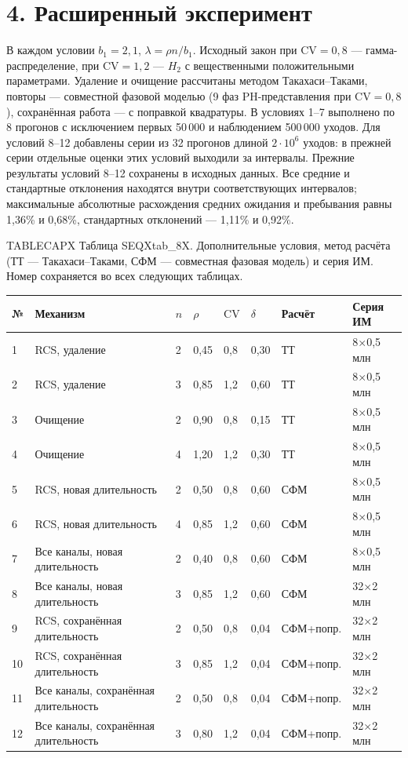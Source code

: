 \section*{4. Расширенный эксперимент}
В каждом условии \(b_1=2{,}1\), \(\lambda=\rho n/b_1\). Исходный закон при \(\mathrm{CV}=0{,}8\) --- гамма-распределение, при \(\mathrm{CV}=1{,}2\) --- \(H_2\) с вещественными положительными параметрами. Удаление и очищение рассчитаны методом Такахаси--Таками, повторы --- совместной фазовой моделью (9 фаз PH-представления при \(\mathrm{CV}=0{,}8\)), сохранённая работа --- с поправкой квадратуры. В условиях 1--7 выполнено по 8 прогонов с исключением первых 50\,000 и наблюдением 500\,000 уходов. Для условий 8--12 добавлены серии из 32 прогонов длиной \(2\cdot10^6\) уходов: в прежней серии отдельные оценки этих условий выходили за интервалы. Прежние результаты условий 8--12 сохранены в исходных данных. Все средние и стандартные отклонения находятся внутри соответствующих интервалов; максимальные абсолютные расхождения средних ожидания и пребывания равны 1,36\% и 0,68\%, стандартных отклонений --- 1,11\% и 0,92\%.

\noindent TABLECAPX Таблица SEQXtab_8X. Дополнительные условия, метод расчёта (ТТ --- Такахаси--Таками, СФМ --- совместная фазовая модель) и серия ИМ. Номер сохраняется во всех следующих таблицах.\par

\setlength{\tabcolsep}{2pt}
\begin{tabular}{p{0.9cm}p{5.2cm}p{0.7cm}p{1.2cm}p{1.0cm}p{1.2cm}p{2.5cm}p{2.2cm}}
\toprule
№ & Механизм & $n$ & $\rho$ & $\mathrm{CV}$ & $\delta$ & Расчёт & Серия ИМ \\
\midrule
1 & RCS, удаление & 2 & 0,45 & 0,8 & 0,30 & ТТ & 8×0,5 млн \\
2 & RCS, удаление & 3 & 0,85 & 1,2 & 0,60 & ТТ & 8×0,5 млн \\
3 & Очищение & 2 & 0,90 & 0,8 & 0,15 & ТТ & 8×0,5 млн \\
4 & Очищение & 4 & 1,20 & 1,2 & 0,30 & ТТ & 8×0,5 млн \\
5 & RCS, новая длительность & 2 & 0,50 & 0,8 & 0,60 & СФМ & 8×0,5 млн \\
6 & RCS, новая длительность & 4 & 0,85 & 1,2 & 0,60 & СФМ & 8×0,5 млн \\
7 & Все каналы, новая длительность & 2 & 0,40 & 0,8 & 0,60 & СФМ & 8×0,5 млн \\
8 & Все каналы, новая длительность & 3 & 0,85 & 1,2 & 0,60 & СФМ & 32×2 млн \\
9 & RCS, сохранённая длительность & 2 & 0,50 & 0,8 & 0,04 & СФМ+попр. & 32×2 млн \\
10 & RCS, сохранённая длительность & 3 & 0,85 & 1,2 & 0,04 & СФМ+попр. & 32×2 млн \\
11 & Все каналы, сохранённая длительность & 2 & 0,50 & 0,8 & 0,04 & СФМ+попр. & 32×2 млн \\
12 & Все каналы, сохранённая длительность & 3 & 0,80 & 1,2 & 0,04 & СФМ+попр. & 32×2 млн \\
\bottomrule
\end{tabular}




